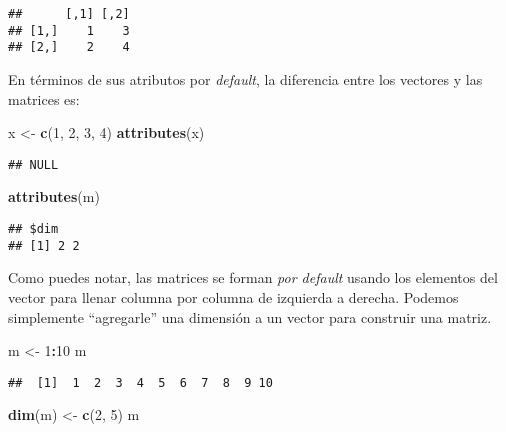 \documentclass[]{article}
\newenvironment{Shaded}{\begin{snugshade}}{\end{snugshade}}
\newcommand{\KeywordTok}[1]{\textcolor[rgb]{0.13,0.29,0.53}{\textbf{#1}}}
\newcommand{\DecValTok}[1]{\textcolor[rgb]{0.00,0.00,0.81}{#1}}
\newcommand{\StringTok}[1]{\textcolor[rgb]{0.31,0.60,0.02}{#1}}
\newcommand{\OperatorTok}[1]{\textcolor[rgb]{0.81,0.36,0.00}{\textbf{#1}}}
\newcommand{\NormalTok}[1]{#1}
\begin{document}
\begin{verbatim}
##      [,1] [,2]
## [1,]    1    3
## [2,]    2    4
\end{verbatim}

En términos de sus atributos por \emph{default}, la diferencia entre los
vectores y las matrices es:

\begin{Shaded}
\begin{Highlighting}[]
\NormalTok{x <-}\StringTok{ }\KeywordTok{c}\NormalTok{(}\DecValTok{1}\NormalTok{, }\DecValTok{2}\NormalTok{, }\DecValTok{3}\NormalTok{, }\DecValTok{4}\NormalTok{)}
\KeywordTok{attributes}\NormalTok{(x)}
\end{Highlighting}
\end{Shaded}

\begin{verbatim}
## NULL
\end{verbatim}

\begin{Shaded}
\begin{Highlighting}[]
\KeywordTok{attributes}\NormalTok{(m)}
\end{Highlighting}
\end{Shaded}

\begin{verbatim}
## $dim
## [1] 2 2
\end{verbatim}

Como puedes notar, las matrices se forman \emph{por default} usando los
elementos del vector para llenar columna por columna de izquierda a
derecha. Podemos simplemente ``agregarle'' una dimensión a un vector
para construir una matriz.

\begin{Shaded}
\begin{Highlighting}[]
\NormalTok{m <-}\StringTok{ }\DecValTok{1}\OperatorTok{:}\DecValTok{10}
\NormalTok{m}
\end{Highlighting}
\end{Shaded}

\begin{verbatim}
##  [1]  1  2  3  4  5  6  7  8  9 10
\end{verbatim}

\begin{Shaded}
\begin{Highlighting}[]
\KeywordTok{dim}\NormalTok{(m) <-}\StringTok{ }\KeywordTok{c}\NormalTok{(}\DecValTok{2}\NormalTok{, }\DecValTok{5}\NormalTok{)}
\NormalTok{m}
\end{Highlighting}
\end{Shaded}
\end{document}
